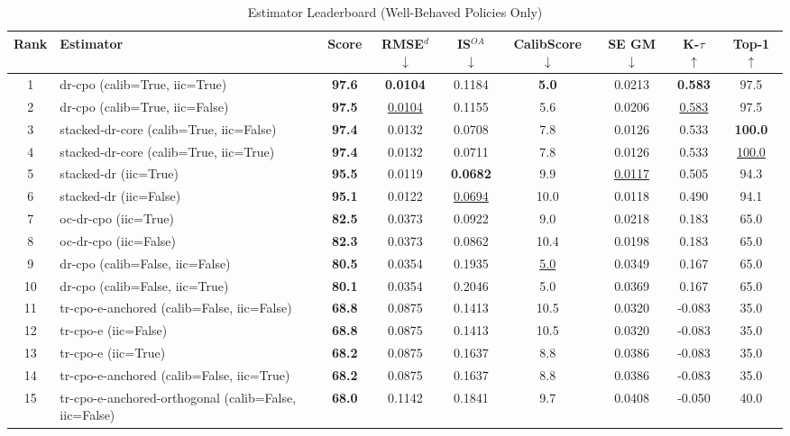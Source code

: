 \begin{table}[htbp]
\centering
\caption{Estimator Leaderboard (Well-Behaved Policies Only)}
\label{tab:leaderboard}
\begin{tabular}{cl|c|cccccc}
\toprule
Rank & Estimator & Score & RMSE$^d$ $\downarrow$ & IS$^{OA}$ $\downarrow$ & CalibScore $\downarrow$ & SE GM $\downarrow$ & K-$\tau$ $\uparrow$ & Top-1 $\uparrow$ \\
\midrule
1 & dr-cpo (calib=True, iic=True) & \textbf{97.6} & \textbf{0.0104} & 0.1184 & \textbf{5.0} & 0.0213 & \textbf{0.583} & 97.5 \\
2 & dr-cpo (calib=True, iic=False) & \textbf{97.5} & \underline{0.0104} & 0.1155 & 5.6 & 0.0206 & \underline{0.583} & 97.5 \\
3 & stacked-dr-core (calib=True, iic=False) & \textbf{97.4} & 0.0132 & 0.0708 & 7.8 & 0.0126 & 0.533 & \textbf{100.0} \\
4 & stacked-dr-core (calib=True, iic=True) & \textbf{97.4} & 0.0132 & 0.0711 & 7.8 & 0.0126 & 0.533 & \underline{100.0} \\
5 & stacked-dr (iic=True) & \textbf{95.5} & 0.0119 & \textbf{0.0682} & 9.9 & \underline{0.0117} & 0.505 & 94.3 \\
6 & stacked-dr (iic=False) & \textbf{95.1} & 0.0122 & \underline{0.0694} & 10.0 & 0.0118 & 0.490 & 94.1 \\
7 & oc-dr-cpo (iic=True) & \textbf{82.5} & 0.0373 & 0.0922 & 9.0 & 0.0218 & 0.183 & 65.0 \\
8 & oc-dr-cpo (iic=False) & \textbf{82.3} & 0.0373 & 0.0862 & 10.4 & 0.0198 & 0.183 & 65.0 \\
9 & dr-cpo (calib=False, iic=False) & \textbf{80.5} & 0.0354 & 0.1935 & \underline{5.0} & 0.0349 & 0.167 & 65.0 \\
10 & dr-cpo (calib=False, iic=True) & \textbf{80.1} & 0.0354 & 0.2046 & 5.0 & 0.0369 & 0.167 & 65.0 \\
11 & tr-cpo-e-anchored (calib=False, iic=False) & \textbf{68.8} & 0.0875 & 0.1413 & 10.5 & 0.0320 & -0.083 & 35.0 \\
12 & tr-cpo-e (iic=False) & \textbf{68.8} & 0.0875 & 0.1413 & 10.5 & 0.0320 & -0.083 & 35.0 \\
13 & tr-cpo-e (iic=True) & \textbf{68.2} & 0.0875 & 0.1637 & 8.8 & 0.0386 & -0.083 & 35.0 \\
14 & tr-cpo-e-anchored (calib=False, iic=True) & \textbf{68.2} & 0.0875 & 0.1637 & 8.8 & 0.0386 & -0.083 & 35.0 \\
15 & tr-cpo-e-anchored-orthogonal (calib=False, iic=False) & \textbf{68.0} & 0.1142 & 0.1841 & 9.7 & 0.0408 & -0.050 & 40.0 \\

\end{tabular}
\end{table}
